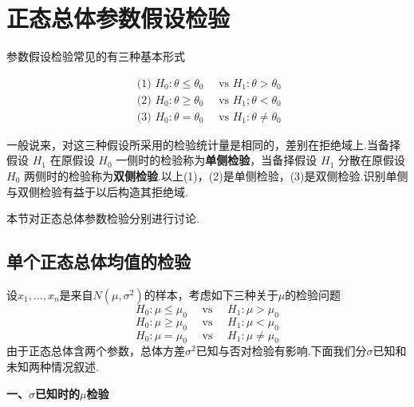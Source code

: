 \section{正态总体参数假设检验}\label{sec:7.2}
参数假设检验常见的有三种基本形式

\[\begin{array} { l } { \text { (1) } H _ { 0 } : \theta \leq \theta _ { 0 } \quad \text { vs } H _ { 1 } : \theta > \theta _ { 0 } } \\ { \text { (2) } H _ { 0 } : \theta \geq \theta _ { 0 } \quad \text { vs } H _ { 1 } ; \theta < \theta _ { 0 } } \\ { \text { (3) } H _ { 0 } : \theta = \theta _ { 0 } \quad \text { vs } H _ { 1 } : \theta \neq \theta _ { 0 } } \end{array}\]

一般说来，对这三种假设所采用的检验统计量是相同的，差别在拒绝域上.当备择假设 $H_{1}$ 在原假设 $H_{0}$ 一侧时的检验称为\textbf{单侧检验}，当备择假设 $H_{1}$ 分散在原假设 $H_{0}$ 两侧时的检验称为\textbf{双侧检验}.以上(1)，(2)是单侧检验，(3)是双侧检验.识别单侧与双侧检验有益于以后构造其拒绝域.

本节对正态总体参数检验分别进行讨论.
\subsection{单个正态总体均值的检验\label{7.2.1}}
设$x _ { 1 } , \dotsc , x _ { n }$是来自$N(\mu ,\sigma^{2})$的样本，考虑如下三种关于$\mu $的检验问题
\begin{equation}\label{eq7.2.1}
H _ { 0 } : \mu \leq \mu _ { 0 } \quad \text { vs } \quad H _ { 1 } : \mu > \mu _ { 0 }
\end{equation}
\begin{equation}\label{eq7.2.2}
H _ { 0 } : \mu \geq \mu _ { 0 } \quad \text { vs } \quad H _ { 1 } : \mu < \mu _ { 0 }
\end{equation}
\begin{equation}\label{eq7.2.3}
H _ { 0 } : \mu = \mu _ { 0 } \quad \text { vs } \quad H _ { 1 } : \mu \neq \mu _ { 0 }
\end{equation}
由于正态总体含两个参数，总体方差$\sigma^{2}$已知与否对检验有影响.下面我们分$\sigma$已知和未知两种情况叙述.

\textbf{一、$\sigma$已知时的$\mu$检验}

